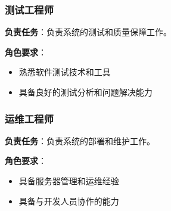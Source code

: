 \subsubsection{测试工程师}
\textbf{负责任务}：负责系统的测试和质量保障工作。

\textbf{角色要求}：
\begin{itemize}[itemsep=2pt,topsep=0pt,parsep=0pt,itemindent=1em]
    \item 熟悉软件测试技术和工具
    \item 具备良好的测试分析和问题解决能力
\end{itemize}

\subsubsection{运维工程师}
\textbf{负责任务}：负责系统的部署和维护工作。

\textbf{角色要求}：
\begin{itemize}[itemsep=2pt,topsep=0pt,parsep=0pt,itemindent=1em]
    \item 具备服务器管理和运维经验
    \item 具备与开发人员协作的能力
\end{itemize}



\newpage